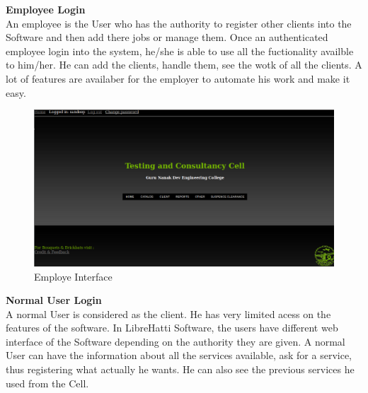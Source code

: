 \newpage
{\bf Employee Login}\\
 
An employee is the User who has the authority to register other 
clients into the Software and then add there jobs or manage them. Once 
an authenticated employee login into the system, he/she is able to use 
all the fuctionality availble to him/her. He can add the clients, handle 
them, see the wotk of all the clients. A lot of features are availaber 
for the employer to automate his work and make it easy.
\begin{figure}[h]
\vskip 2cm
\centering \includegraphics[scale=1.0]{images/user1.png}
\caption{Employe Interface}
\end{figure}
\newpage
{\bf Normal User Login}\\

A normal User is considered as the client. He has very limited acess on 
the features of the software. In LibreHatti Software, the users 
have different web interface of the Software depending on the authority 
they are given. A normal User can have the information about all the 
services available, ask for a service, thus registering what actually 
he wants. He can also see the previous services he used from the Cell. 

